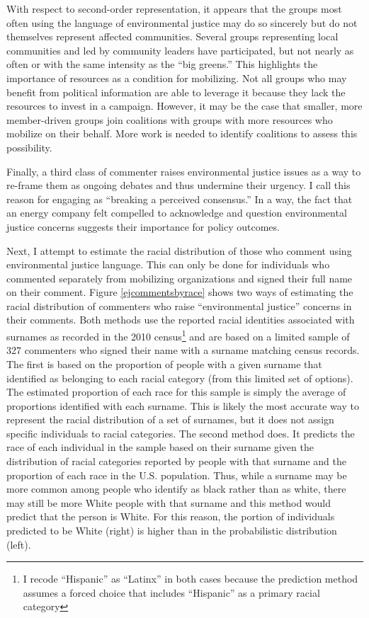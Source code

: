  With respect to second-order representation, it appears that the groups most often using the language of environmental justice may do so sincerely but do not themselves represent affected communities. Several groups representing local communities and led by community leaders have participated, but not nearly as often or with the same intensity as the ``big greens.'' This highlights the importance of resources as a condition for mobilizing. Not all groups who may benefit from political information are able to leverage it because they lack the resources to invest in a campaign. However, it may be the case that smaller, more member-driven groups join coalitions with groups with more resources who mobilize on their behalf. More work is needed to identify coalitions to assess this possibility.

 Finally, a third class of commenter raises environmental justice issues as a way to re-frame them as ongoing debates and thus undermine their urgency. I call this reason for engaging as ``breaking a perceived consensus.'' In a way, the fact that an energy company felt compelled to acknowledge and question environmental justice concerns suggests their importance for policy outcomes.

Next, I attempt to estimate the racial distribution of those who comment using environmental justice language. This can only be done for individuals who commented separately from mobilizing organizations and signed their full name on their comment. 
Figure \ref{ejcommentsbyrace} shows two ways of estimating the racial distribution of commenters who raise ``environmental justice'' concerns in their comments. Both methods use the reported racial identities associated with surnames as recorded in the 2010 census\footnote{I recode ``Hispanic'' as ``Latinx'' in both cases because the prediction method assumes a forced choice that includes ``Hispanic'' as a primary racial category} and are based on a limited sample of 327 commenters who signed their name with a surname matching census records.  The first is based on the proportion of people with a given surname that identified as belonging to each racial category (from this limited set of options). The estimated proportion of each race for this sample is simply the average of proportions identified with each surname. This is likely the most accurate way to represent the racial distribution of a set of surnames, but it does not assign specific individuals to racial categories. The second method does. It predicts the race of each individual in the sample based on their surname given the distribution of racial categories reported by people with that surname and the proportion of each race in the U.S. population. Thus, while a surname may be more common among people who identify as black rather than as white, there may still be more White people with that surname and this method would predict that the person is White. For this reason, the portion of individuals predicted to be White (right) is higher than in the probabilistic distribution (left). 

